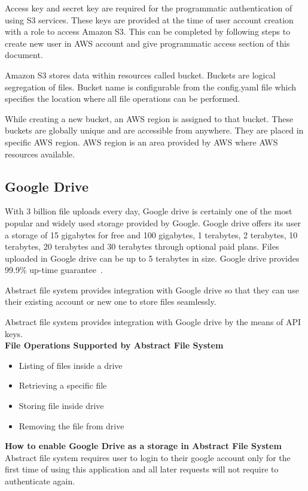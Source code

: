 Access key and secret key are required for the programmatic authentication of 
using S3 services. These keys are provided at the time of 
user account creation with a role to access Amazon S3.
This can be completed by following steps to create new user 
in AWS account and give programmatic access section of this document.

Amazon S3 stores data within resources called bucket. Buckets are logical
segregation of files. Bucket name is configurable from the config.yaml file
which specifies the location where all file operations can be performed.

While creating a new bucket, an AWS region is assigned to that bucket. These 
buckets are globally unique and are accessible from anywhere. They are
placed in specific AWS region. AWS region is an area provided by AWS where
AWS resources available.

\subsection{Google Drive}

With 3 billion file uploads every day, Google drive is certainly one of the 
most popular and widely used storage provided by Google. Google drive offers 
its user a storage of 15 gigabytes for free and 100 gigabytes, 1 terabytes, 2 
terabytes, 10 terabytes, 20 terabytes and 30 terabytes through optional paid 
plans. Files uploaded in Google drive can be up to 5 terabytes in size. Google 
drive provides 99.9\% up-time guarantee~\cite{hid-sp18-420-google-drive-wiki}. 

Abstract file system provides integration with Google drive so that they can 
use their existing account or new one to store files seamlessly.

Abstract file system provides integration with Google drive by the means of 
API keys. 
\\

\textbf{File Operations Supported by Abstract File System }
\begin{itemize}
    \item  Listing of files inside a drive
    \item  Retrieving a specific file 
    \item  Storing file inside drive
    \item  Removing the file from drive
\end{itemize}

\textbf{How to enable Google Drive as a storage in Abstract File System}
\\
Abstract file system requires user to login to their google account only for 
the first time of using this application and all later requests will not 
require to authenticate again. 

